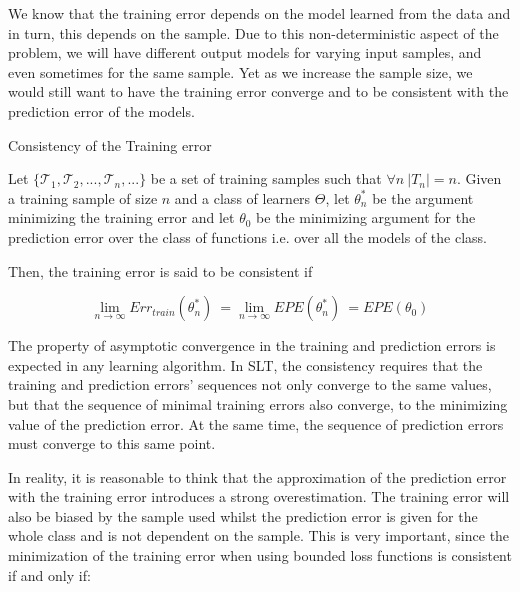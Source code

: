 We know that the training error depends on the model learned from the data and in turn, this depends on the sample. Due to this non-deterministic aspect of the problem, we will have different output models for varying input samples, and even sometimes for the same sample. Yet as we increase the sample size, we would still want to have the training error converge and to be consistent with the prediction error of the models.



\begin{definition}{Consistency of the Training error}

Let $\{\mathcal {T}_1, \mathcal {T}_2, ..., \mathcal {T}_n, ... \}$ be a set of training samples such that $\forall n \ |T_n|=n$. Given a training sample of size $n$ and a class of learners $\Theta$, let $\theta^{*}_n$ be the argument minimizing the training error and let $\theta_0$ be the minimizing argument for the prediction error over the class of functions i.e. over all the models of the class.

Then, the training error is said to be consistent if

\begin{equation}
\lim_{n\to\infty} Err_{train}(\theta^{*}_n) \ = \lim_{n\to\infty} EPE(\theta^{*}_n) \ = EPE(\theta_0)
\end{equation}

\end{definition}

The property of asymptotic convergence in the training and prediction errors is expected in any learning algorithm. In SLT, the consistency requires that the training and prediction errors' sequences not only converge to the same values, but that the sequence of minimal training errors also converge, to the minimizing value of the prediction error. At the same time, the sequence of prediction errors must converge to this same point.

In reality, it is reasonable to think that the approximation of the prediction error with the training error introduces a strong overestimation. The training error will also be biased by the sample used whilst the prediction error is given for the whole class and is not dependent on the sample. This is very important, since the minimization of the training error when using bounded loss functions is consistent if and only if:


